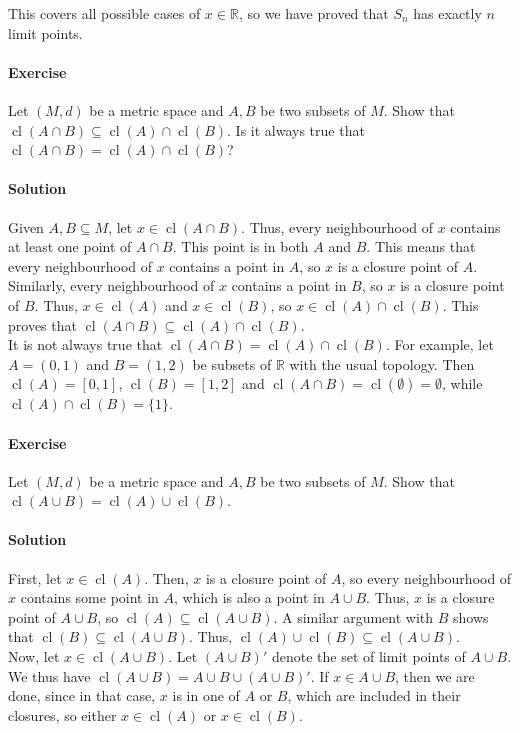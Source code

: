 \documentclass[10pt]{article}
\newcounter{prob}
\def\problem{\stepcounter{prob}\paragraph{Exercise \arabic{prob}}}
\def\solution{\paragraph{Solution}}
\def\cl{\operatorname{cl}}
\begin{document}
        This covers all possible cases of $x \in \mathbb{R}$, so we have proved that $S_n$ has exactly $n$ limit points.
        

        \problem Let $(M, d)$ be a metric space and $A, B$ be two subsets of $M$. Show that $\cl(A \cap B) \subseteq \cl(A) \cap \cl(B)$.
        Is it always true that $\cl(A \cap B) = \cl(A) \cap \cl(B)$?

        \solution Given $A, B \subseteq M$, let $x\in \cl(A \cap B)$. Thus, every neighbourhood of $x$ contains at least one point of $A \cap B$.
        This point is in both $A$ and $B$.
        This means that every neighbourhood of $x$ contains a point in $A$, so $x$ is a closure point of $A$. Similarly, every neighbourhood
        of $x$ contains a point in $B$, so $x$ is a closure point of $B$. Thus, $x \in \cl(A)$ and $x \in \cl(B)$, so $x \in \cl(A) \cap \cl(B)$.
        This proves that $\cl(A \cap B) \subseteq \cl(A) \cap \cl(B)$. \\

        It is not always true that $\cl(A \cap B) = \cl(A) \cap \cl(B)$. For example, let $A = (0, 1)$ and $B = (1, 2)$ be subsets of $\mathbb{R}$
        with the usual topology. Then $\cl(A) = [0, 1]$, $\cl(B) = [1, 2]$ and $\cl(A \cap B) = \cl(\emptyset) = \emptyset$,
        while $\cl(A) \cap \cl(B) = \{1\}$.

        \problem Let $(M, d)$ be a metric space and $A, B$ be two subsets of $M$. Show that $\cl(A \cup B) = \cl(A) \cup \cl(B)$.
        
        \solution First, let $x \in \cl(A)$. Then, $x$ is a closure point of $A$, so every neighbourhood of $x$ contains
        some point in $A$, which is also a point in $A \cup B$. Thus, $x$ is a closure point of $A \cup B$, so $\cl(A) \subseteq \cl(A \cup B)$.
        A similar argument with $B$ shows that $\cl(B) \subseteq \cl(A \cup B)$. Thus, $\cl(A) \cup \cl(B) \subseteq \cl(A \cup B)$. \\

        Now, let $x \in \cl(A \cup B)$. Let $(A \cup B)'$ denote the set of limit points of $A \cup B$.
        We thus have $\cl(A \cup B) = A \cup B \cup (A \cup B)'$.
        If $x \in A \cup B$, then we are done, since in that case, $x$ is in one of $A$ or $B$, which are included in their closures,
        so either $x \in \cl(A)$ or $x \in \cl(B)$.
\end{document}

